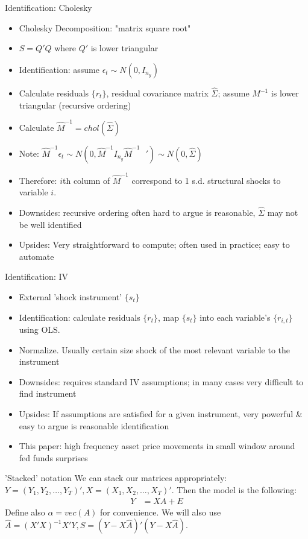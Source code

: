 \documentclass{beamer}
\begin{document}
\begin{frame}{Identification: Cholesky}
\begin{itemize}
\item Cholesky Decomposition: "matrix square root"
\item $S = Q'Q$ where $Q'$ is lower triangular
\item Identification: assume $\epsilon_t \sim N(0,I_{n_y})$
\item Calculate residuals $\{r_t\}$, residual covariance matrix $\hat{\Sigma}$; assume $M^{-1}$ is lower triangular (recursive ordering)
\item Calculate $\hat{M}^{-1} = chol(\hat{\Sigma})$
\item Note: $\hat{M}^{-1} \epsilon_t \sim N(0,\hat{M}^{-1} I_{n_y} \hat{M}^{-1}\text{ }') \sim N(0,\hat{\Sigma})$
\item Therefore: $i$th column of $\hat{M}^{-1}$ correspond to 1 s.d. structural shocks to variable $i$.
\item Downsides: recursive ordering often hard to argue is reasonable, $\hat{\Sigma}$ may not be well identified
\item Upsides: Very straightforward to compute; often used in practice; easy to automate
\end{itemize}
\end{frame}

\begin{frame}{Identification: IV}
\begin{itemize}
\item External 'shock instrument' $\{s_t\}$
\item Identification: calculate residuals $\{r_t\}$, map $\{s_t\}$ into each variable's $\{r_{i,t}\}$ using OLS.
\item Normalize. Usually certain size shock of the most relevant variable to the instrument
\item Downsides: requires standard IV assumptions; in many cases very difficult to find instrument
\item Upsides: If assumptions are satisfied for a given instrument, very powerful \& easy to argue is reasonable identification
\item This paper: high frequency asset price movements in small window around fed funds surprises
\end{itemize}
\end{frame}

\begin{frame}{'Stacked' notation}
We can stack our matrices appropriately: $Y = (Y_1, Y_2, \dots, Y_T)', X = (X_1, X_2, \dots, X_T)'. $ Then the model is the following:
\begin{align*}
Y &= XA + E
\end{align*}
Define also $\alpha = vec(A)$ for convenience. We will also use $\hat{A} = (X'X)^{-1}X'Y, S = (Y-X\hat{A})'(Y-X\hat{A}).$
\end{frame}
\end{document}
